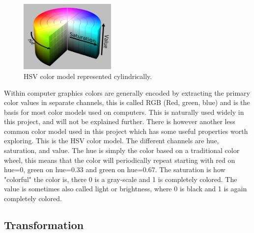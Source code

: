 
\begin{figure}
    \begin{center}
        \includegraphics[width=0.42\textwidth]{fig/hsv_illustration}
    \end{center}
    \caption{HSV color model represented cylindrically.}
\end{figure}

Within computer graphics colors are generally encoded by extracting the primary color values in separate channels, this is called RGB (Red, green, blue) and is the basis for most color models used on computers.
This is naturally used widely in this project, and will not be explained further. There is however another less common color model used in this project which has some useful properties worth exploring. 
This is the HSV color model. The different channels are hue, saturation, and value. The hue is simply the color based on a traditional color wheel, this means that the color will periodically repeat starting with red on hue=0, green on hue=0.33 and green on hue=0.67. The saturation is how "colorful" the color is, there 0 is a gray-scale and 1 is completely colored. The value is sometimes also called light or brightness, where 0 is black and 1 is again completely colored.


\subsection*{Transformation}







